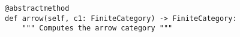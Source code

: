 \begin{verbatim}
@abstractmethod
def arrow(self, c1: FiniteCategory) -> FiniteCategory:
    """ Computes the arrow category """
\end{verbatim}